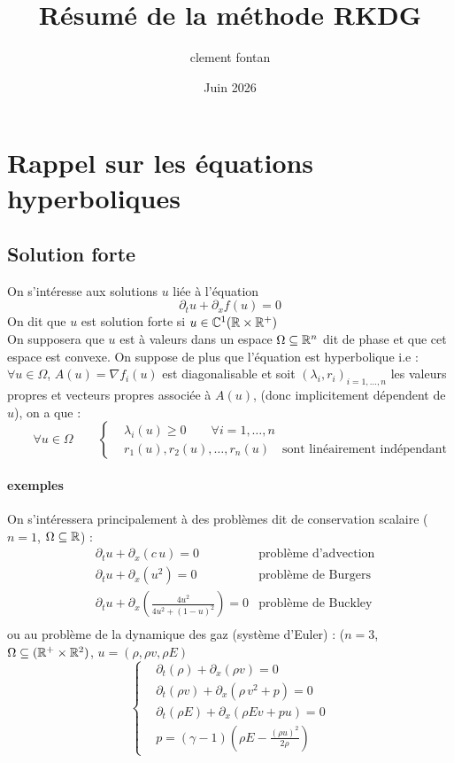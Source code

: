 \documentclass[11pt]{article}%
\title{Résumé de la méthode RKDG}
\author{clement fontan}
\date{Juin 2026}
\begin{document}
\section{Rappel sur les équations hyperboliques}
\subsection{Solution forte}
On s'intéresse aux solutions $u$ liée à l'équation  
\begin{equation}\label{eq forte}
    \partial_tu + \partial_{x}f(u) =0
\end{equation}
On dit que $u$ est solution forte si $u \in \mathbb{C}^1(\mathbb{R} \times\mathbb{R}^+)$\\
On supposera que $u$ est à valeurs dans un espace $\Omega \subseteq \mathbb{R}^n$ dit de phase et que cet espace est convexe.
On suppose de plus que l'équation est hyperbolique i.e : \\
$\forall u \in \Omega$, $A(u) = \nabla f_i(u)$ est diagonalisable et soit $(\lambda_i,r_i)_{i=1,\dots,n}$ les valeurs propres et vecteurs propres associée à $A(u)$, (donc implicitement dépendent de $u$), on a que :
\begin{equation}
\qquad \forall u\in\Omega \qquad 
    \left\{   
    \begin{aligned}
    & \lambda_i(u) \geq 0 \qquad \forall i=1,\dots,n \\
    & r_1(u),r_2(u),\dots,r_n(u) \quad \text{sont linéairement indépendant}
    \end{aligned}
    \right.    
\end{equation}

\paragraph{exemples}
On s'intéressera principalement à des problèmes dit de conservation scalaire ($n=1$, $\Omega \subseteq \mathbb{R}$) :
\begin{align}
    &\partial_tu +\partial_x(c\,u) =0   &\text{problème d'advection} \\
    &\partial_tu +\partial_x(u^2) =0 &\text{problème de Burgers} \\
    &\partial_tu +\partial_x\left(\frac{4u^2}{4u^2+(1-u)^2}\right) =0 &\text{problème de Buckley} \\
\end{align}
ou au problème de la dynamique des gaz (système d'Euler) : ($n=3$, $\Omega \subseteq(\mathbb{R}^+\times\mathbb{R}^2)$, $u=(\rho,\rho v, \rho E)$
\begin{equation}
    \left\{
    \begin{aligned}
        &\partial_t(\rho) + \partial_x(\rho v) = 0\\
        &\partial_t(\rho v)+\partial_x(\rho\, v^2 +p)=0\\
        &\partial_t(\rho E)+\partial_x(\rho E v+pu)=0\\
        &p = (\gamma-1)\left( \rho E - \frac{(\rho u)^2}{2\rho} \right)
    \end{aligned}\right.
\end{equation}
\end{document}
